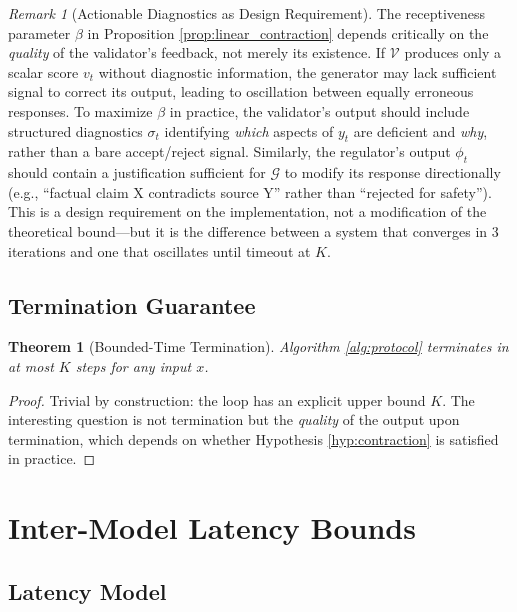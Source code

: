 \documentclass[11pt,a4paper]{article}
\newtheorem{theorem}{Theorem}[section]
\theoremstyle{remark}
\newtheorem{remark}{Remark}[section]
\begin{document}
\begin{remark}[Actionable Diagnostics as Design Requirement]
\label{rem:diagnostics}
The receptiveness parameter $\beta$ in Proposition \ref{prop:linear_contraction} depends critically on the \emph{quality} of the validator's feedback, not merely its existence. If $\mathcal{V}$ produces only a scalar score $v_t$ without diagnostic information, the generator may lack sufficient signal to correct its output, leading to oscillation between equally erroneous responses. To maximize $\beta$ in practice, the validator's output should include structured diagnostics $\sigma_t$ identifying \emph{which} aspects of $y_t$ are deficient and \emph{why}, rather than a bare accept/reject signal. Similarly, the regulator's output $\phi_t$ should contain a justification sufficient for $\mathcal{G}$ to modify its response directionally (e.g., ``factual claim X contradicts source Y'' rather than ``rejected for safety''). This is a design requirement on the implementation, not a modification of the theoretical bound---but it is the difference between a system that converges in 3 iterations and one that oscillates until timeout at $K$.
\end{remark}

\subsection{Termination Guarantee}

\begin{theorem}[Bounded-Time Termination]
\label{thm:termination}
Algorithm \ref{alg:protocol} terminates in at most $K$ steps for any input $x$.
\end{theorem}

\begin{proof}
Trivial by construction: the loop has an explicit upper bound $K$. The interesting question is not termination but the \emph{quality} of the output upon termination, which depends on whether Hypothesis \ref{hyp:contraction} is satisfied in practice.
\end{proof}

\section{Inter-Model Latency Bounds}
\label{sec:latency}

\subsection{Latency Model}
\end{document}
